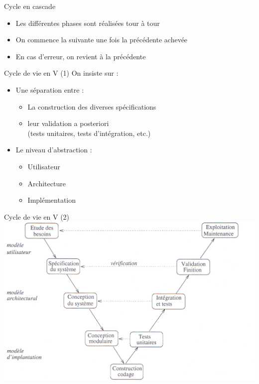 \documentclass[14pt]{beamer}
\begin{document}
\begin{framentitle}{Cycle en cascade}
    \begin{itemize}
        \item Les différentes phases sont réalisées tour à tour
        \item On commence la suivante une fois la précédente achevée
        \item En cas d'erreur, on revient à la précédente
    \end{itemize}
\end{framentitle}

\begin{framentitle}{Cycle de vie en V (1)}
    On insiste sur :
    \begin{itemize}
        \item Une séparation entre :
            \begin{itemize}
                \item La construction des diverses spécifications
                \item leur validation a posteriori\\(tests
                    unitaires, tests d'intégration, etc.)
            \end{itemize}
        \item Le niveau d'abstraction :
            \begin{itemize}
                \item Utilisateur
                \item Architecture
                \item Implémentation
            \end{itemize}
    \end{itemize}
\end{framentitle}

\begin{framentitle}{Cycle de vie en V (2)}
    \includegraphics[width=\textwidth]{fig4.png}
\end{framentitle}
\end{document}
